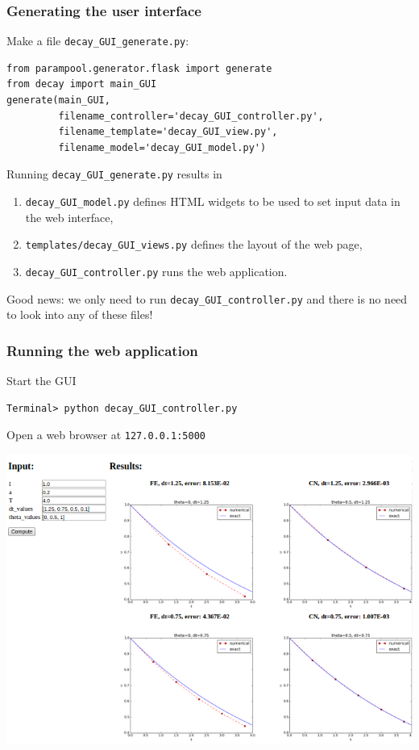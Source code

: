 \documentclass{beamer}
\begin{document}
\begin{frame}
\frametitle{Generating the user interface}

Make a file \Verb!decay_GUI_generate.py!:

\begin{verbatim}
from parampool.generator.flask import generate
from decay import main_GUI
generate(main_GUI,
         filename_controller='decay_GUI_controller.py',
         filename_template='decay_GUI_view.py',
         filename_model='decay_GUI_model.py')
\end{verbatim}

Running \Verb!decay_GUI_generate.py! results in

\begin{enumerate}
 \item \Verb!decay_GUI_model.py! defines HTML widgets to be used to set
    input data in the web interface,

 \item \Verb!templates/decay_GUI_views.py! defines the layout of the web page,

 \item \Verb!decay_GUI_controller.py! runs the web application.
\end{enumerate}

\noindent
Good news: we only need to run \Verb!decay_GUI_controller.py!
and there is no need to look into any of these files!
\end{frame}

\begin{frame}
\frametitle{Running the web application}

Start the GUI

\begin{verbatim}
Terminal> python decay_GUI_controller.py
\end{verbatim}
Open a web browser at \texttt{127.0.0.1:5000}



\centerline{\includegraphics[width=1.0\linewidth]{fig-softeng/web_GUI.png}}
\end{frame}
\end{document}
